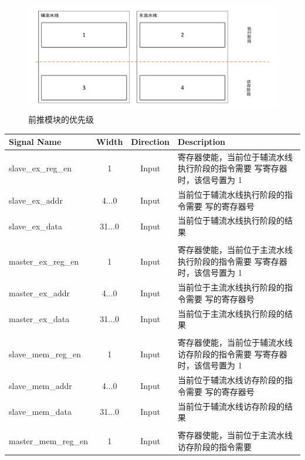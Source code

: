 \documentclass[blue,normal,cn,hide]{elegantbook}
\begin{document}
\begin{figure}[htpb]
    \centering
    \includegraphics[width=.8\textwidth]{figures/ForwardPriority}
    \caption{前推模块的优先级}
    \label{fig:ForwardingUnitPriority}
\end{figure}

\begin{table}
    \renewcommand\arraystretch{1.25}
    \centering
    \begin{tabular}{lccm{}}
        \toprule 
        \rowcolor{black!20} \textbf{Signal Name} & \textbf{Width} & \textbf{Direction} & \textbf{Description} \\
        \midrule
        slave\_ex\_reg\_en & 1 & Input & 寄存器使能，当前位于辅流水线执行阶段的指令需要
        写寄存器时，该信号置为 1 \\
        slave\_ex\_addr & 4...0 & Input & 当前位于辅流水线执行阶段的指令需要
        写的寄存器号 \\
        slave\_ex\_data & 31...0 & Input & 当前位于辅流水线执行阶段的结果 \\
        \\
        master\_ex\_reg\_en & 1 & Input & 寄存器使能，当前位于主流水线执行阶段的指令需要
        写寄存器时，该信号置为 1 \\
        master\_ex\_addr & 4...0 & Input & 当前位于主流水线执行阶段的指令需要
        写的寄存器号 \\
        master\_ex\_data & 31...0 & Input & 当前位于主流水线执行阶段的结果 \\
        \\
        slave\_mem\_reg\_en & 1 & Input & 寄存器使能，当前位于辅流水线访存阶段的指令需要
        写寄存器时，该信号置为 1 \\
        slave\_mem\_addr & 4...0 & Input & 当前位于辅流水线访存阶段的指令需要
        写的寄存器号 \\
        slave\_mem\_data & 31...0 & Input & 当前位于辅流水线访存阶段的结果 \\
        \\
        master\_mem\_reg\_en & 1 & Input & 寄存器使能，当前位于主流水线访存阶段的指令需要

\end{tabular}
\end{table}
\end{document}
